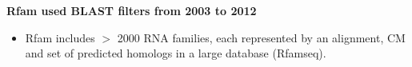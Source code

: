 \documentclass[landscape]{slides}
\begin{document}
\begin{slide}
\begin{center}

\textbf{Rfam used BLAST filters from 2003 to 2012}

\end{center}

\begin{itemize}
\item Rfam includes $>$ 2000 RNA families, each represented by an
  alignment, CM and set of predicted homologs in a large database (Rfamseq).
\end{itemize}


\vfill
\end{slide}
\end{document}
